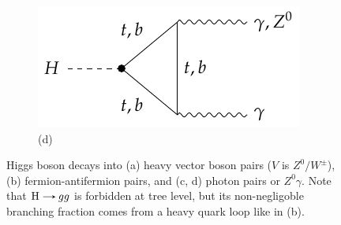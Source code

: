 \begin{figure}[!ht]
    \begin{subfigure}[t]{0.5\mylength}
            \centering
            \includegraphics[height=0.17\mylength]{resources/H_decay_diagrams/v4.pdf}
            \setlength{\unitlength}{0.25\mylength}
            \caption{\footnotesize (d)}
    \end{subfigure}%
    \vspace*{-0.0cm}
    \caption{Higgs boson decays into (a) heavy vector boson pairs ($V$ is $Z^{0}/W^{\pm}$), (b) fermion-antifermion pairs, and (c, d) photon pairs or $Z^0\gamma$. Note that $\text{H}\protect\decaysto gg$ is forbidden at tree level, but its non-negligoble branching fraction comes from a heavy quark loop like in (b).}
    \label{fig:Higgs_decays}
    \vspace*{-0.0cm}
\end{figure}

